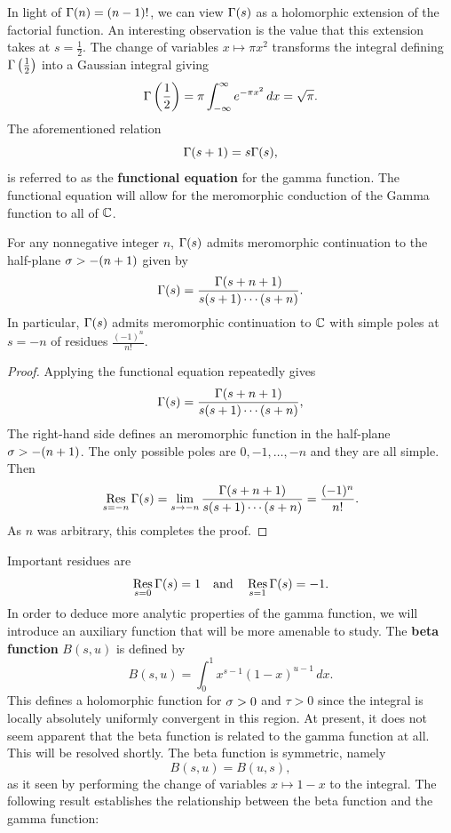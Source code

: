     In light of \(\Gamma(n) = (n-1)!\), we can view \(\Gamma(s)\) as a holomorphic extension of the factorial function. An interesting observation is the value that this extension takes at \(s = \frac{1}{2}\). The change of variables \(x \mapsto \pi x^{2}\) transforms the integral defining \(\Gamma\left(\frac{1}{2}\right)\) into a Gaussian integral giving
    \begin{equation}\label{equ:gamma_function_at_1/2}
      \Gamma\left(\frac{1}{2}\right) = \pi\int_{-\infty}^{\infty}e^{-\pi x^{2}}\,dx = \sqrt{\pi}.
    \end{equation}
    The aforementioned relation
    \[
      \Gamma(s+1) = s\Gamma(s),
    \]
    is referred to as the \textbf{functional equation} for the gamma function. The functional equation will allow for the meromorphic conduction of the Gamma function to all of \(\mathbb{C}\).

    \begin{theorem}\label{thm:continuation_of_gamma_function}
      For any nonnegative integer \(n\), \(\Gamma(s)\) admits meromorphic continuation to the half-plane \(\sigma > -(n+1)\) given by
      \[
        \Gamma(s) = \frac{\Gamma(s+n+1)}{s(s+1) \cdots (s+n)}.
      \]
      In particular, \(\Gamma(s)\) admits meromorphic continuation to \(\mathbb{C}\) with simple poles at \(s = -n\) of residues \(\frac{(-1)^{n}}{n!}\).
    \end{theorem}
    \begin{proof}
      Applying the functional equation repeatedly gives
      \[
        \Gamma(s) = \frac{\Gamma(s+n+1)}{s(s+1) \cdots (s+n)},
      \]
      The right-hand side defines an meromorphic function in the half-plane \(\sigma > -(n+1)\). The only possible poles are \(0,-1,\ldots,-n\) and they are all simple. Then
      \[
        \operatorname*{\mathrm{Res}}_{s = -n}\Gamma(s) = \lim_{s \to -n}\frac{\Gamma(s+n+1)}{s(s+1) \cdots (s+n)} = \frac{(-1)^{n}}{n!}. 
      \]
      As \(n\) was arbitrary, this completes the proof.
    \end{proof}

    Important residues are
    \[
      \operatorname*{\mathrm{Res}}_{s = 0}\Gamma(s) = 1 \quad \text{and} \quad \operatorname*{\mathrm{Res}}_{s = 1}\Gamma(s) = -1.
    \]
    In order to deduce more analytic properties of the gamma function, we will introduce an auxiliary function that will be more amenable to study. The \textbf{beta function} \(B(s,u)\) is defined by
    \[
      B(s,u) = \int_{0}^{1}x^{s-1}(1-x)^{u-1}\,dx.
    \]
    This defines a holomorphic function for \(\sigma > 0\) and \(\tau > 0\) since the integral is locally absolutely uniformly convergent in this region. At present, it does not seem apparent that the beta function is related to the gamma function at all. This will be resolved shortly. The beta function is symmetric, namely
    \[
      B(s,u) = B(u,s),
    \]
    as it seen by performing the change of variables \(x \mapsto 1-x\) to the integral. The following result establishes the relationship between the beta function and the gamma function:

